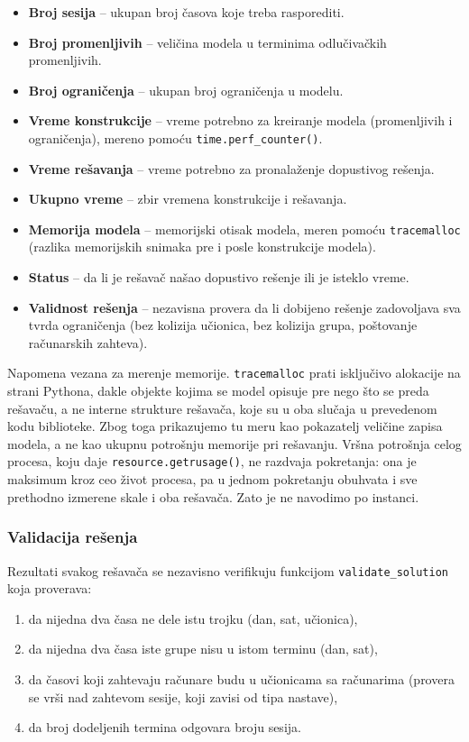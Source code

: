 \documentclass[12pt,oneside]{memoir}
\begin{document}
\begin{itemize}
\item \textbf{Broj sesija} -- ukupan broj časova koje treba rasporediti.
\item \textbf{Broj promenljivih} -- veličina modela u terminima
  odlučivačkih promenljivih.
\item \textbf{Broj ograničenja} -- ukupan broj ograničenja u modelu.
\item \textbf{Vreme konstrukcije} -- vreme potrebno za kreiranje
  modela (promenljivih i ograničenja), mereno pomoću
  \texttt{time.perf\_counter()}.
\item \textbf{Vreme rešavanja} -- vreme potrebno za pronalaženje
  dopustivog rešenja.
\item \textbf{Ukupno vreme} -- zbir vremena konstrukcije i rešavanja.
\item \textbf{Memorija modela} -- memorijski otisak modela, meren
  pomoću \texttt{tracemalloc} (razlika memorijskih snimaka pre i
  posle konstrukcije modela).
\item \textbf{Status} -- da li je rešavač našao dopustivo rešenje
  ili je isteklo vreme.
\item \textbf{Validnost rešenja} -- nezavisna provera da li dobijeno
  rešenje zadovoljava sva tvrda ograničenja (bez kolizija učionica,
  bez kolizija grupa, poštovanje računarskih zahteva).
\end{itemize}

Napomena vezana za merenje memorije. \texttt{tracemalloc} prati
isključivo alokacije na strani Pythona, dakle objekte kojima se model
opisuje pre nego što se preda rešavaču, a ne interne strukture
rešavača, koje su u oba slučaja u prevedenom kodu biblioteke. Zbog
toga prikazujemo tu meru kao pokazatelj veličine zapisa modela, a ne
kao ukupnu potrošnju memorije pri rešavanju. Vršna potrošnja celog
procesa, koju daje \texttt{resource.getrusage()}, ne razdvaja
pokretanja: ona je maksimum kroz ceo život procesa, pa u jednom
pokretanju obuhvata i sve prethodno izmerene skale i oba rešavača.
Zato je ne navodimo po instanci.

\subsubsection{Validacija rešenja}

Rezultati svakog rešavača se nezavisno verifikuju funkcijom
\texttt{validate\_solution} koja proverava:
\begin{enumerate}
\item da nijedna dva časa ne dele istu trojku (dan, sat, učionica),
\item da nijedna dva časa iste grupe nisu u istom terminu (dan, sat),
\item da časovi koji zahtevaju računare budu u učionicama sa
  računarima (provera se vrši nad zahtevom sesije, koji zavisi od tipa
  nastave),
\item da broj dodeljenih termina odgovara broju sesija.
\end{enumerate}
\end{document}
